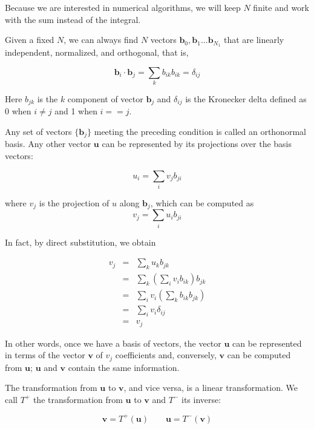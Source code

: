 \documentclass[justified, sixbynine]{tufte-book}
\theoremstyle{plain}%
\newtheorem * {corollary}{Corollary}
\theoremstyle{definition}
\theoremstyle{remark}
\newtheorem * {remark}{Remark}
\newtheorem * {note}{Note}
\begin{document}
\begin{fullwidth}
Because we are interested in numerical algorithms, we will keep $N$ finite and work with the sum instead of the integral.

Given a fixed $N$, we can always find $N$ vectors $\mathbf{b}_0, \mathbf{b}_1...\mathbf{b}_{N_1}$ that are linearly independent, normalized, and orthogonal, that is,

\begin{equation}
\mathbf{b}_i \cdot \mathbf{b}_j = \sum_k b_{ik} b_{ik} = \delta_{ij}
\end{equation}

Here $b_{jk}$ is the $k$ component of vector $\mathbf{b}_j$ and $\delta_{ij}$ is the Kronecker delta defined as 0 when $i\neq j$ and 1 when $i == j$.

Any set of vectors $\{\mathbf{b}_j\}$ meeting the preceding condition is called an orthonormal basis. Any other vector $\mathbf{u}$ can be represented by its projections over the basis vectors:

\begin{equation}
  u_i = \sum_i v_j b_{ji}
\end{equation}

where $v_j$ is the projection of $u$ along $\mathbf{b}_j$, which can be computed as
\begin{equation}
  v_j = \sum_i u_i b_{ji}
\end{equation}

In fact, by direct substitution, we obtain

\begin{eqnarray}
  v_j &=& \sum_k u_k b_{jk} \\
      &=& \sum_k (\sum_i v_i b_{ik}) b_{jk} \\
      &=& \sum_i v_i (\sum_k b_{ik} b_{jk}) \\
      &=& \sum_i v_i \delta_{ij} \\
      &=& v_j
\end{eqnarray}

In other words, once we have a basis of vectors, the vector $\mathbf{u}$ can be represented in terms of the vector $\mathbf{v}$ of $v_j$ coefficients and, conversely, $\mathbf{v}$ can be computed from $\mathbf{u}$; $\mathbf{u}$ and $\mathbf{v}$ contain the same information.

The transformation from $\mathbf{u}$ to $\mathbf{v}$, and vice versa, is a linear transformation. We call $T^+$ the transformation from $\mathbf{u}$ to $\mathbf{v}$  and $T^-$ its inverse:

\begin{equation}
\mathbf{v} = T^+(\mathbf{u}) \qquad
\mathbf{u} = T^-(\mathbf{v})
\end{equation}


\end{fullwidth}
\end{document}
